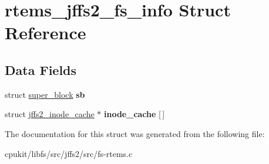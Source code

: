 \hypertarget{structrtems__jffs2__fs__info}{}\section{rtems\+\_\+jffs2\+\_\+fs\+\_\+info Struct Reference}
\label{structrtems__jffs2__fs__info}
\subsection*{Data Fields}
\begin{DoxyCompactItemize}
\item 
\mbox{\label{structrtems__jffs2__fs__info_a8bc95e926765cac853f8978db4e0d168}} 
struct \mbox{\hyperlink{structsuper__block}{super\+\_\+block}} {\bfseries sb}
\item 
\mbox{\label{structrtems__jffs2__fs__info_a1644fce6fbb0de36ac683fdb0c74dd4f}} 
struct \mbox{\hyperlink{structjffs2__inode__cache}{jffs2\+\_\+inode\+\_\+cache}} $\ast$ {\bfseries inode\+\_\+cache} \mbox{[}$\,$\mbox{]}
\end{DoxyCompactItemize}


The documentation for this struct was generated from the following file\+:\begin{DoxyCompactItemize}
\item 
cpukit/libfs/src/jffs2/src/fs-\/rtems.\+c\end{DoxyCompactItemize}
